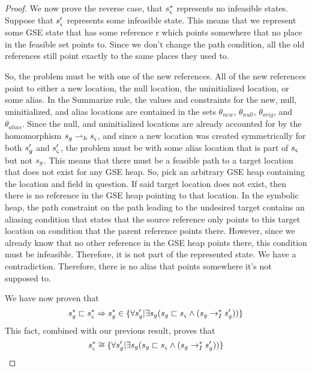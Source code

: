 \begin{proof}
We now prove the reverse case, that $s_{\varsigma}^*$ represents no infeasible states. Suppose that $s_{\varsigma}^\prime$ represents some infeasible state. This means that we represent some GSE state that has some reference r which points somewhere that no place in the feasible set points to. Since we don't change the path condition, all the old references still point exactly to the same places they used to. 

So, the problem must be with one of the new references. All of the new references point to either a new location, the null location, the uninitialized location, or some alias. In the Summarize rule, the values and constraints for the new, null, uninitialized, and alias locations are contained in the sets $\theta_{new}$, $\theta_{null}$, $\theta_\mathit{orig}$, and $\theta_{alias}$. Since the null, and uninitialized locations are already accounted for by the homomorphism $s_{g} \rightharpoonup_h s_{\varsigma}$, and since a new location was created symmetrically for both $s_{g}^\prime$ and $s_{\varsigma}^\prime$, the problem must be with some alias location that is part of $s_{\varsigma}$ but not $s_{g}$. This means that there must be a feasible path to a target location that does not exist for any GSE heap. So, pick an arbitrary GSE heap containing the location and field in question. If said target location does not exist, then there is no reference in the GSE heap pointing to that location. In the symbolic heap, the path constraint on the path leading to the undesired target contains an aliasing condition that states that the source reference only points to this target location on condition that the parent reference points there. However, since we already know that no other reference in the GSE heap points there, this condition must be infeasible. Therefore, it is not part of the represented state. We have a contradiction. Therefore, there is no alias that points somewhere it's not supposed to.

We have now proven that 
$$ s_{g}^* \sqsubset s_{\varsigma}^*  \Rightarrow  s_{g}^* \in \{\forall s_{g}^\prime | \exists s_{g} (s_{g} \sqsubset s_{\varsigma} \wedge (s_{g} \rightarrow_I^* s_{g}^\prime) ) \}$$
This fact, combined with our previous result, proves that
$$s_{\varsigma}^*  \cong \{\forall s_{g}^\prime | \exists s_{g} (s_{g} \sqsubset s_{\varsigma} \wedge (s_{g} \rightarrow_I^* s_{g}^\prime) ) \}$$

\end{proof}

